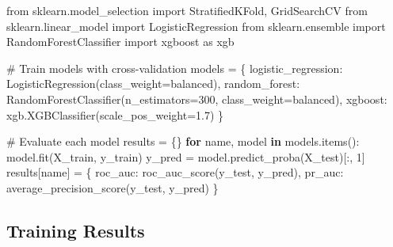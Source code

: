 \documentclass[
  letterpaper,
  DIV=11,
  numbers=noendperiod]{scrartcl}
\newenvironment{Shaded}{\begin{snugshade}}{\end{snugshade}}
\newcommand{\CommentTok}[1]{\textcolor[rgb]{0.37,0.37,0.37}{#1}}
\newcommand{\ControlFlowTok}[1]{\textcolor[rgb]{0.00,0.23,0.31}{\textbf{#1}}}
\newcommand{\DecValTok}[1]{\textcolor[rgb]{0.68,0.00,0.00}{#1}}
\newcommand{\FloatTok}[1]{\textcolor[rgb]{0.68,0.00,0.00}{#1}}
\newcommand{\ImportTok}[1]{\textcolor[rgb]{0.00,0.46,0.62}{#1}}
\newcommand{\KeywordTok}[1]{\textcolor[rgb]{0.00,0.23,0.31}{\textbf{#1}}}
\newcommand{\NormalTok}[1]{\textcolor[rgb]{0.00,0.23,0.31}{#1}}
\newcommand{\OperatorTok}[1]{\textcolor[rgb]{0.37,0.37,0.37}{#1}}
\newcommand{\StringTok}[1]{\textcolor[rgb]{0.13,0.47,0.30}{#1}}
\renewenvironment{Shaded}{%
  \begin{tcolorbox}[%
    enhanced,%
    colback=codebg,%
    colframe=codebg,%
    borderline west={3pt}{0pt}{sectionblue},%
    fontupper=\small\ttfamily,%
    boxrule=0pt,%
    arc=0pt,%
    boxsep=5pt,%
    left=2mm,%
    right=2mm,%
    top=2mm,%
    bottom=2mm%
  ]%
}{%
  \end{tcolorbox}%
}
\begin{document}
\begin{Shaded}
\begin{Highlighting}[]
\ImportTok{from}\NormalTok{ sklearn.model\_selection }\ImportTok{import}\NormalTok{ StratifiedKFold, GridSearchCV}
\ImportTok{from}\NormalTok{ sklearn.linear\_model }\ImportTok{import}\NormalTok{ LogisticRegression}
\ImportTok{from}\NormalTok{ sklearn.ensemble }\ImportTok{import}\NormalTok{ RandomForestClassifier}
\ImportTok{import}\NormalTok{ xgboost }\ImportTok{as}\NormalTok{ xgb}

\CommentTok{\# Train models with cross{-}validation}
\NormalTok{models }\OperatorTok{=}\NormalTok{ \{}
    \StringTok{\textquotesingle{}logistic\_regression\textquotesingle{}}\NormalTok{: LogisticRegression(class\_weight}\OperatorTok{=}\StringTok{\textquotesingle{}balanced\textquotesingle{}}\NormalTok{),}
    \StringTok{\textquotesingle{}random\_forest\textquotesingle{}}\NormalTok{: RandomForestClassifier(n\_estimators}\OperatorTok{=}\DecValTok{300}\NormalTok{, }
\NormalTok{                                           class\_weight}\OperatorTok{=}\StringTok{\textquotesingle{}balanced\textquotesingle{}}\NormalTok{),}
    \StringTok{\textquotesingle{}xgboost\textquotesingle{}}\NormalTok{: xgb.XGBClassifier(scale\_pos\_weight}\OperatorTok{=}\FloatTok{1.7}\NormalTok{)}
\NormalTok{\}}

\CommentTok{\# Evaluate each model}
\NormalTok{results }\OperatorTok{=}\NormalTok{ \{\}}
\ControlFlowTok{for}\NormalTok{ name, model }\KeywordTok{in}\NormalTok{ models.items():}
\NormalTok{    model.fit(X\_train, y\_train)}
\NormalTok{    y\_pred }\OperatorTok{=}\NormalTok{ model.predict\_proba(X\_test)[:, }\DecValTok{1}\NormalTok{]}
\NormalTok{    results[name] }\OperatorTok{=}\NormalTok{ \{}
        \StringTok{\textquotesingle{}roc\_auc\textquotesingle{}}\NormalTok{: roc\_auc\_score(y\_test, y\_pred),}
        \StringTok{\textquotesingle{}pr\_auc\textquotesingle{}}\NormalTok{: average\_precision\_score(y\_test, y\_pred)}
\NormalTok{    \}}
\end{Highlighting}
\end{Shaded}

\subsection{Training Results}\label{training-results}
\end{document}
